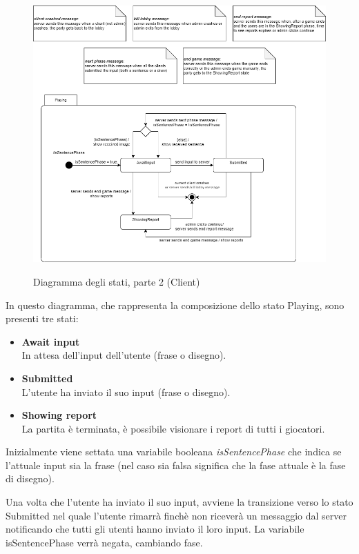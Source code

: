 \begin{figure}[H]
    \caption{Diagramma degli stati, parte 2 (Client)}
    \centering
    \includegraphics[width=150mm]{img/ingSoft/State Client Macro.png}
    \label{fig:client_state}
\end{figure}

\noindent In questo diagramma, che rappresenta la composizione dello stato Playing, sono presenti tre stati:
\begin{itemize}
    \item {\textbf{Await input}}\\
    In attesa dell'input dell'utente (frase o disegno).
    \item {\textbf{Submitted}}\\
    L'utente ha inviato il suo input (frase o disegno).
    \item {\textbf{Showing report}}\\
    La partita è terminata, è possibile visionare i report di tutti i giocatori.
\end{itemize}
Inizialmente viene settata una variabile booleana \emph{isSentencePhase} che indica se l'attuale input sia la frase (nel caso sia falsa significa che la fase attuale è la fase di disegno).\newline

\noindent Una volta che l'utente ha inviato il suo input, avviene la transizione verso lo stato Submitted nel quale l'utente rimarrà finchè non riceverà un messaggio dal server notificando che tutti gli utenti hanno inviato il loro input. La variabile isSentencePhase verrà negata, cambiando fase.\newline

